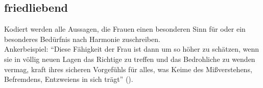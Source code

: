 \documentclass[12pt, titlepage=true, toc=bib]{scrartcl}
\begin{document}
\subsection*{friedliebend}

Kodiert werden alle Aussagen, die Frauen einen besonderen Sinn für oder ein besonderes Bedürfnis nach Harmonie zuschreiben.\\
Ankerbeispiel: "`Diese Fähigkeit der Frau ist dann um so höher zu schätzen, wenn sie in völlig neuen Lagen das Richtige zu treffen und das Bedrohliche zu wenden vermag, kraft ihres sicheren Vorgefühls für alles, was Keime des Mißverstehens, Befremdens, Entzweiens in sich trägt"' (\cite[36]{weinhandl_wie_1941}).
\end{document}
